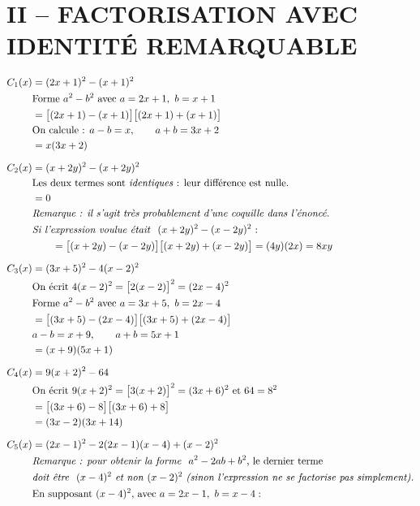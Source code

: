 \documentclass[11pt]{article}
\begin{document}
	\section*{II -- FACTORISATION AVEC IDENTITÉ REMARQUABLE}
	
	\[
	\begin{aligned}
		C_1(x) &= (2x+1)^2-(x+1)^2\\
		&\text{Forme } a^2-b^2 \text{ avec } a=2x+1,\ b=x+1\\
		&= \big[(2x+1)-(x+1)\big]\big[(2x+1)+(x+1)\big]\\
		&\text{On calcule : } a-b = x,\qquad a+b = 3x+2\\
		&= x(3x+2)\\[6pt]
		C_2(x) &= (x+2y)^2-(x+2y)^2\\
		&\text{Les deux termes sont \emph{identiques} : leur différence est nulle.}\\
		&= 0\\
		&\text{\emph{Remarque : il s'agit très probablement d'une coquille dans l'énoncé.}}\\
		&\text{\emph{Si l'expression voulue était } } (x+2y)^2-(x-2y)^2 \text{ :}\\
		&\qquad = \big[(x+2y)-(x-2y)\big]\big[(x+2y)+(x-2y)\big] = (4y)(2x) = 8xy\\[6pt]
		C_3(x) &= (3x+5)^2-4(x-2)^2\\
		&\text{On écrit } 4(x-2)^2 = \big[2(x-2)\big]^2 = (2x-4)^2\\
		&\text{Forme } a^2-b^2 \text{ avec } a=3x+5,\ b=2x-4\\
		&= \big[(3x+5)-(2x-4)\big]\big[(3x+5)+(2x-4)\big]\\
		&a-b = x+9,\qquad a+b = 5x+1\\
		&= (x+9)(5x+1)\\[6pt]
		C_4(x) &= 9(x+2)^2-64\\
		&\text{On écrit } 9(x+2)^2 = \big[3(x+2)\big]^2 = (3x+6)^2 \text{ et } 64=8^2\\
		&= \big[(3x+6)-8\big]\big[(3x+6)+8\big]\\
		&= (3x-2)(3x+14)\\[6pt]
		C_5(x) &= (2x-1)^2-2(2x-1)(x-4)+(x-2)^2\\
		&\text{\emph{Remarque : pour obtenir la forme } } a^2-2ab+b^2\text{, le dernier terme}\\
		&\text{\emph{doit être } } (x-4)^2 \text{ \emph{et non} } (x-2)^2 \text{ \emph{(sinon l'expression ne se factorise pas simplement).}}\\
		&\text{En supposant } (x-4)^2\text{, avec } a=2x-1,\ b=x-4 :\\

\end{aligned}\]
\end{document}
